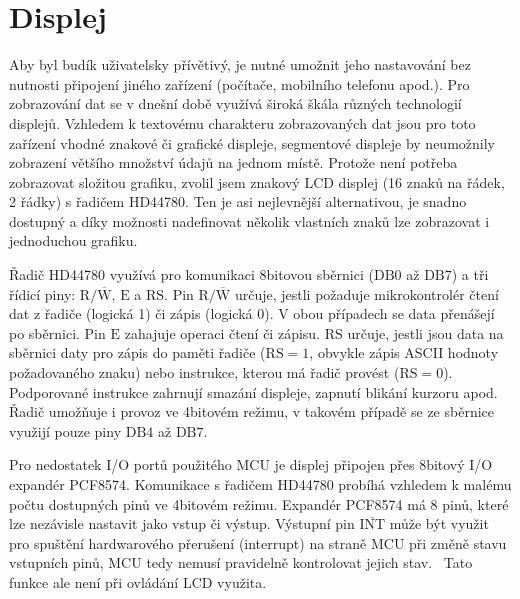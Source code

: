 \section{Displej}
Aby byl budík uživatelsky přívětivý, je nutné umožnit jeho nastavování bez
nutnosti připojení jiného zařízení (počítače, mobilního telefonu apod.).
Pro zobrazování dat se v dnešní době využívá široká škála různých technologií
displejů. Vzhledem k textovému charakteru zobrazovaných dat jsou pro toto
zařízení vhodné znakové či grafické displeje, segmentové displeje by neumožnily
zobrazení většího množství údajů na jednom místě. Protože není potřeba
zobrazovat složitou grafiku, zvolil jsem znakový LCD displej (16 znaků na
řádek, 2 řádky) s řadičem HD44780. Ten je asi nejlevnější alternativou, je
snadno dostupný a díky možnosti nadefinovat několik vlastních znaků lze
zobrazovat i jednoduchou grafiku.

Řadič HD44780 využívá pro komunikaci 8bitovou sběrnici ($\mathrm{DB0}$ až
$\mathrm{DB7}$) a tři řídicí piny: $\mathrm{R}/\overline{\mathrm{W}}$,
$\mathrm{E}$ a $\mathrm{RS}$. Pin $\mathrm{R}/\overline{\mathrm{W}}$ určuje,
jestli požaduje mikrokontrolér čtení dat z řadiče (logická 1) či zápis (logická
0). V obou případech se data přenášejí po sběrnici. Pin $\mathrm{E}$ zahajuje
operaci čtení či zápisu. $\mathrm{RS}$ určuje, jestli jsou data na sběrnici
daty pro zápis do paměti řadiče ($\mathrm{RS} = 1$, obvykle zápis ASCII hodnoty
požadovaného znaku) nebo instrukce, kterou má řadič provést ($\mathrm{RS} =
0$). Podporované instrukce zahrnují smazání displeje, zapnutí blikání kurzoru
apod. Řadič umožňuje i provoz ve 4bitovém režimu, v takovém případě se ze
sběrnice využijí pouze piny $\mathrm{DB4}$ až $\mathrm{DB7}$.~\cite{dshHD44780}

Pro nedostatek I/O portů použitého MCU je displej připojen přes
8bitový \IIC{} I/O expandér PCF8574. Komunikace s řadičem
HD44780 probíhá vzhledem k malému počtu dostupných pinů ve 4bitovém režimu.
Expandér PCF8574 má 8 pinů, které lze nezávisle nastavit jako vstup či výstup.
Výstupní pin $\overline{\mathrm{INT}}$ může být využit pro spuštění
hardwarového přerušení (interrupt) na straně MCU při změně stavu vstupních
pinů, MCU tedy nemusí pravidelně kontrolovat jejich stav.~\cite{dshPCF8574}
Tato funkce ale není při ovládání LCD využita.

